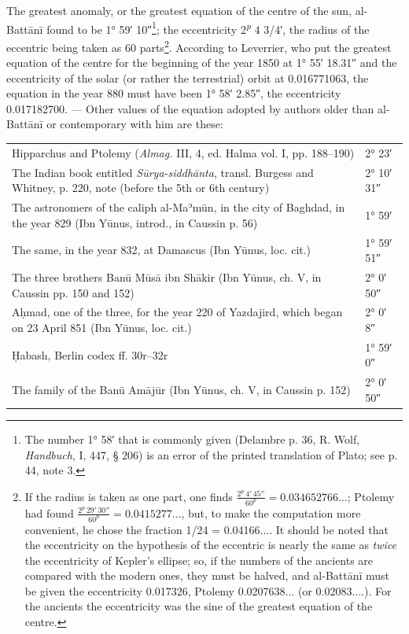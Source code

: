 \documentclass[11pt]{article}
\newcommand{\Pg}[1]{\marginpar{\footnotesize\color{gray}#1}}
\begin{document}
\par The greatest anomaly, or the greatest equation of the centre of the sun, al-Battānī found to be 1° 59′ 10″\footnote{The number 1° 58′ that is commonly given (Delambre p. 36, R. Wolf, \emph{Handbuch}, I, 447, § 206) is an error of the printed translation of Plato; see p. 44, note 3.}; the eccentricity 2\textsuperscript{\itshape p} 4 3/4′, the radius of the eccentric being taken as 60 parts\footnote{If the radius is taken as one part, one finds $\frac{2^{p}\,4'\,45''}{60^{p}} = 0.034652766\ldots$; Ptolemy had found $\frac{2^{p}\,29'\,30''}{60^{p}} = 0.0415277\ldots$, but, to make the computation more convenient, he chose the fraction 1/24 = 0.04166.... It should be noted that the eccentricity on the hypothesis of the eccentric is nearly the same as \emph{twice} the eccentricity of Kepler's ellipse; so, if the numbers of the ancients are compared with the modern ones, they must be halved, and al-Battānī must be given the eccentricity 0.017326, Ptolemy 0.0207638... (or 0.02083....). For the ancients the eccentricity was the sine of the greatest equation of the centre.}. According to Leverrier, who put the greatest equation of the centre for the beginning of the year 1850 at 1° 55′ 18.31″ and the eccentricity of the solar (or rather the terrestrial) orbit at 0.016771063, the equation in the year 880 must have been 1° 58′ 2.85″, the eccentricity 0.017182700. — Other values of the equation adopted by authors older than al-Battānī or contemporary with him are these:\par
\Pg{I 214}\begin{center}\small\begin{tabular}{p{115mm}l}
Hipparchus and Ptolemy (\emph{Almag.} III, 4, ed. Halma vol. I, pp. 188–190) & 2° 23′ \\
The Indian book entitled \emph{Sūrya-siddhānta}, transl. Burgess and Whitney, p. 220, note (before the 5th or 6th century) & 2° 10′ 31″ \\
The astronomers of the caliph al-Maʾmūn, in the city of Baghdad, in the year 829 (Ibn Yūnus, introd., in Caussin p. 56)\footnotemark{} & 1° 59′ \\
The same, in the year 832, at Damascus (Ibn Yūnus, loc. cit.) & 1° 59′ 51″ \\
The three brothers Banū Mūsā ibn Shākir (Ibn Yūnus, ch. V, in Caussin pp. 150 and 152) & 2° 0′ 50″ \\
Aḥmad, one of the three, for the year 220 of Yazdajird, which began on 23 April 851 (Ibn Yūnus, loc. cit.) & 2° 0′ 8″ \\
Ḥabash, Berlin codex ff. 30r–32r & 1° 59′ 0″ \\
The family of the Banū Amājūr (Ibn Yūnus, ch. V, in Caussin p. 152) & 2° 0′ 50″ \\
\end{tabular}\end{center}
\end{document}
